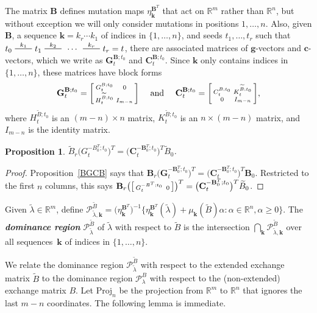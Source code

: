 \documentclass{amsart}
\newtheorem{proposition}{Proposition}[section]
\theoremstyle{definition}
\theoremstyle{remark}
\numberwithin{equation}{section}
\newcommand{\newword}[1]{\textbf{\emph{#1}}}
\newcommand{\reals}{\mathbb R}
\newcommand{\edge}{\,\,\rule[2.7pt]{20pt}{0.5pt}\,\,}
\newcommand{\set}[1]{{\lbrace #1 \rbrace}}
\newcommand{\sett}[1]{{\bigl\lbrace #1 \bigr\rbrace}}
\newcommand{\GG}{{\mathbf G}}
\newcommand{\CC}{{\mathbf C}}
\newcommand{\0}{{\mathbf{0}}}
\newcommand{\Proj}{\mathrm{Proj}}
\newcommand{\g}{\mathbf{g}}
\renewcommand{\c}{\mathbf{c}}
\newcommand{\kk}{{\boldsymbol{k}}}
\newcommand{\tB}{{\widetilde{B}}}
\newcommand{\BB}{\mathbf{B}}
\renewcommand{\H}{\mathcal{H}}
\renewcommand{\P}{\mathcal{P}}
\renewcommand{\c}{{\mathbf c}}
\begin{document}
The matrix $\BB$ defines mutation maps $\eta_\kk^{\BB^T}$ that act on $\reals^m$ rather than $\reals^n$, but without exception we will only consider mutations in positions $1,\ldots,n$.
Also, given $\BB$, a sequence $\kk=k_r\cdots k_1$ of indices in $\set{1,\ldots,n}$, and seeds $t_1,\ldots,t_r$ such that $t_0\overset{k_1}{\edge}t_1\overset{k_2}{\edge}\,\cdots\,\overset{k_r}{\edge}t_r=t$, there are associated matrices of $\g$-vectors and $\c$-vectors, which we write as $\GG_t^{\BB;t_0}$ and $\CC_t^{\BB;t_0}$.
Since $\kk$ only contains indices in $\set{1,\ldots,n}$, these matrices have block forms
\[
\GG_t^{\BB;t_0}=\begin{bsmallmatrix}G_t^{B;t_0}&0\\H_t^{\tB;t_0}&I_{m-n}\end{bsmallmatrix}
\quad\text{ and }\quad
\CC_t^{\BB;t_0}=\begin{bsmallmatrix}C_t^{B;t_0}&K_t^{\tB;t_0}\\0&I_{m-n}\end{bsmallmatrix},
\]
where $H_t^{\tB;t_0}$ is an $(m-n)\times n$ matrix, $K_t^{\tB;t_0}$ is an $n\times(m-n)$ matrix, and $I_{m-n}$ is the identity matrix.

\begin{proposition}\label{BGCB ext}
$\tB_r\bigl(G_t^{-B_0^T;t_0}\bigr)^T=\bigl(\CC_t^{-\BB_0^T;t_0}\bigr)^T\tB_0$.
\end{proposition}
\begin{proof}
Proposition~\ref{BGCB} says that $\BB_r\bigl(\GG_t^{-\BB_0^T;t_0}\bigr)^T=\bigl(\CC_t^{-\BB_0^T;t_0}\bigr)^T\BB_0$.
Restricted to the first $n$ columns, this says $\BB_r\bigl(\begin{bsmallmatrix}G_t^{-B^T;t_0}&\,0\end{bsmallmatrix}\bigr)^T=\bigl(\CC_t^{-\BB_0^T;t_0}\bigr)^T\tB_0$.
\end{proof}

Given $\tilde\lambda\in\reals^m$, define $\P^\tB_{\tilde\lambda,\kk}=\bigl(\eta_{\kk}^{\BB^T}\bigr)^{-1}\sett{\eta_\kk^{\BB^T}(\tilde\lambda)+\mu_\kk(\tB)\alpha:\alpha\in\reals^n,\alpha\ge0}$.
The \newword{dominance region} $\P^\tB_{\tilde\lambda}$ of $\tilde\lambda$ with respect to $\tB$ is the intersection $\bigcap_\kk\P^\tB_{\tilde\lambda,\kk}$ over all sequences~$\kk$ of indices in $\set{1,\ldots,n}$.

We relate the dominance region $\P_{\tilde\lambda}^\tB$ with respect to the extended exchange matrix $\tB$ to the dominance region $\P_\lambda^B$ with respect to the (non-extended) exchange matrix $B$.
Let $\Proj_n$ be the projection from $\reals^m$ to $\reals^n$ that ignores the last $m-n$ coordinates.
The following lemma is immediate.
\end{document}
